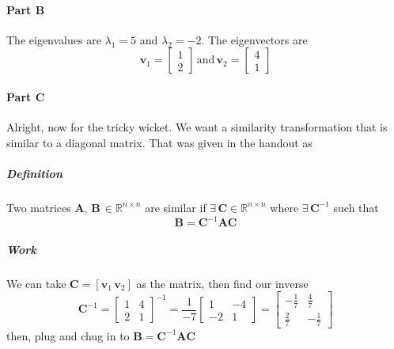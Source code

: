 \documentclass{article}
\begin{document}
            \paragraph{Part B}
                The eigenvalues are $\lambda_1=5$ and $\lambda_2=-2$.
                The eigenvectors are 
                \[
                    \mathbf{v}_1=\begin{bmatrix}1\\2\end{bmatrix}
                    \,\text{and}\,
                    \mathbf{v}_2=\begin{bmatrix}4\\1\end{bmatrix}
                \]
            \paragraph{Part C}
                Alright, now for the tricky wicket. We want a similarity
                transformation that is similar to a diagonal matrix.
                That was given in the handout as
                \subparagraph{Definition}
                    Two matrices $\mathbf{A},\,\mathbf{B}\,\in\mathbb{R}^{n\times{n}}$ 
                    are similar
                    if $\exists\,\mathbf{C}\in\mathbb{R}^{n\times{n}}$ 
                    where $\exists\,\mathbf{C}^{-1}$ 
                    such that
                    \[
                        \mathbf{B}=\mathbf{C}^{-1}\mathbf{A}\mathbf{C}
                    \]
                \subparagraph{Work}
                    We can take $\mathbf{C}=[\mathbf{v}_1\,\mathbf{v}_2]$ as the matrix,
                    then find our inverse
                    \[
                        \mathbf{C}^{-1}
                        =
                        \begin{bmatrix}1 & 4\\2 & 1\end{bmatrix}^{-1}
                        =
                        \frac{1}{-7}
                        \begin{bmatrix}1 & -4\\-2 & 1\end{bmatrix}
                        =
                        \begin{bmatrix}-\frac{1}{7} & \frac{4}{7}\\\frac{2}{7} & -\frac{1}{7}\end{bmatrix}
                    \]
                    then, plug and chug in to $\mathbf{B}=\mathbf{C}^{-1}\mathbf{A}\mathbf{C}$
\end{document}
